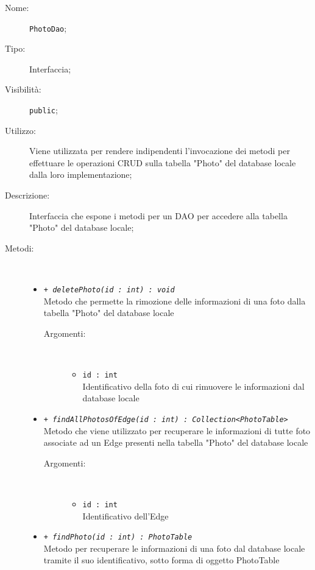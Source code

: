 \documentclass[../DefinizioneDiProdotto.tex]{subfiles}
\begin{document}
\begin{description}
	\item[Nome:] \texttt{PhotoDao};
	\item[Tipo:] Interfaccia;
	\item[Visibilità:] \texttt{public};
	\item[Utilizzo:] Viene utilizzata per rendere indipendenti l'invocazione dei metodi per effettuare le operazioni CRUD sulla tabella "Photo" del database locale dalla loro implementazione;
	\item[Descrizione:] Interfaccia che espone i metodi per un DAO per accedere alla tabella "Photo" del database locale;
	\item[Metodi:] \
	\begin{itemize}
		\item \texttt{+ \textit{deletePhoto(id : int) : void}}\\
		Metodo che permette la rimozione delle informazioni di una foto dalla tabella "Photo" del database locale
		\begin{description}
			\item[Argomenti:] \
			\begin{itemize}
				\item \texttt{id : int}\\
				Identificativo della foto di cui rimuovere le informazioni dal database locale\end{itemize}
		\end{description}
		\item \texttt{+ \textit{findAllPhotosOfEdge(id : int) : Collection<PhotoTable>}}\\
		Metodo che viene utilizzato per recuperare le informazioni di tutte foto associate ad un Edge presenti nella tabella "Photo" del database locale
		\begin{description}
			\item[Argomenti:] \
			\begin{itemize}
				\item \texttt{id : int}\\
				Identificativo dell'Edge\end{itemize}
		\end{description}
		\item \texttt{+ \textit{findPhoto(id : int) : PhotoTable}}\\
		Metodo per recuperare le informazioni di una foto dal database locale tramite il suo identificativo, sotto forma di oggetto PhotoTable
		\begin{description}

\end{description}
\end{itemize}
\end{description}
\end{document}
